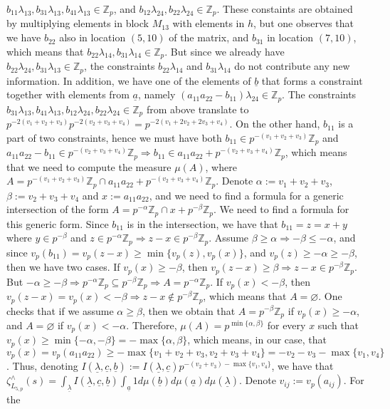 \documentclass{article}
\begin{document}
$b_{11}\lambda_{13},b_{31}\lambda_{13},b_{41}\lambda_{13}\in\mathbb{Z}_{p}$, and $b_{12}\lambda_{24},b_{22}\lambda_{24}\in\mathbb{Z}_{p}$. These constaints are obtained by multiplying elements in block $M_{13}$ with elements in $h$, but one observes that we have $b_{22}$ also in location $(5,10)$ of the matrix, and $b_{31}$ in location $(7,10)$, which means that $b_{22}\lambda_{14},b_{31}\lambda_{14}\in\mathbb{Z}_{p}$. But since we already have $b_{22}\lambda_{24},b_{31}\lambda_{13}\in\mathbb{Z}_{p}$, the constraints $b_{22}\lambda_{14}$ and $b_{31}\lambda_{14}$ do not contribute any new information. In addition, we have one of the elements of $\underline{b}$ that forms a constraint together with elements from $\underline{a}$, namely $(a_{11}a_{22}-b_{11})\lambda_{24}\in\mathbb{Z}_{p}$. The constraints $b_{31}\lambda_{13},b_{41}\lambda_{13},b_{12}\lambda_{24},b_{22}\lambda_{24}\in\mathbb{Z}_{p}$ from above translate to $p^{-2(v_{1}+v_{2}+v_{3})}p^{-2(v_{2}+v_{3}+v_{4})}=p^{-2(v_{1}+2v_{2}+2v_{3}+v_{4})}$. On the other hand, $b_{11}$ is a part of two constraints, hence we must have both $b_{11}\in{p^{-(v_{1}+v_{2}+v_{3})}\mathbb{Z}_{p}}$ and $a_{11}a_{22}-b_{11}\in{p^{-(v_{2}+v_{3}+v_{4})}\mathbb{Z}_{p}}\Rightarrow{b_{11}\in{a_{11}a_{22}+p^{-(v_{2}+v_{3}+v_{4})}\mathbb{Z}_{p}}}$, which means that we need to compute the measure $\mu(A)$, where $A=p^{-(v_{1}+v_{2}+v_{3})}\mathbb{Z}_{p}\cap{a_{11}a_{22}+p^{-(v_{2}+v_{3}+v_{4})}\mathbb{Z}_{p}}$. Denote $\alpha:=v_{1}+v_{2}+v_{3}$, $\beta:=v_{2}+v_{3}+v_{4}$ and $x:=a_{11}a_{22}$, and we need to find a formula for a generic intersection of the form $A={p^{-\alpha}\mathbb{Z}_{p}\cap{x+p^{-\beta}}\mathbb{Z}_{p}}$. We need to find a formula for this generic form. Since $b_{11}$ is in the intersection, we have that $b_{11}=z=x+y$ where $y\in{p^{-\beta}}$ and $z\in{p^{-\alpha}\mathbb{Z}_{p}}\Rightarrow{z-x\in{p^{-\beta}\mathbb{Z}_{p}}}$. Assume $\beta\geq\alpha\Rightarrow{-\beta\leq-\alpha}$, and since $v_{p}(b_{11})=v_{p}(z-x)\geq{\min\{v_{p}(z),v_{p}(x)\}}$, and $v_{p}(z)\geq{-\alpha}\geq{-\beta}$, then we have two cases. If $v_{p}(x)\geq{-\beta}$, then $v_{p}(z-x)\geq{\beta}\Rightarrow{z-x\in{p^{-\beta}\mathbb{Z}_{p}}}$. But $-\alpha\geq{-\beta}\Rightarrow{p^{-\alpha}\mathbb{Z}_{p}\subseteq{p^{-\beta}\mathbb{Z}_{p}}}\Rightarrow{A=p^{-\alpha}\mathbb{Z}_{p}}$. If $v_{p}(x)<{-\beta}$, then $v_{p}(z-x)=v_{p}(x)<-\beta\Rightarrow{z-x}\notin{p^{-\beta}\mathbb{Z}_{p}}$, which means that $A=\varnothing$. One checks that if we assume $\alpha\geq\beta$, then we obtain that $A=p^{-\beta}\mathbb{Z}_{p}$ if $v_{p}(x)\geq{-\alpha}$, and $A=\varnothing$ if $v_{p}(x)<-\alpha$. Therefore, $\mu(A)=p^{\min\{\alpha,\beta\}}$ for every $x$ such that $v_{p}(x)\geq\min\{-\alpha,-\beta\}=-\max\{\alpha,\beta\}$, which means, in our case, that $v_{p}(x)=v_{p}(a_{11}a_{22})\geq-\max\{v_{1}+v_{2}+v_{3},v_{2}+v_{3}+v_{4}\}=-v_{2}-v_{3}-\max\{v_{1},v_{4}\}$. Thus, denoting $I(\underline{\lambda},\underline{c},\underline{b}):=I(\underline{\lambda},\underline{c})p^{-(v_{2}+v_{3})-\max\{v_{1},v_{4}\}}$, we have that $\zeta_{L_{5,p}}^{\wedge}(s)=\displaystyle\int_{\underline\lambda}I(\underline{\lambda},\underline{c},\underline{b})\int_{\underline{a}}1d\mu(\underline{b})d\mu(\underline{a})d\mu(\underline{\lambda})$. Denote $v_{ij}:=v_{p}(a_{ij})$. For the 
\end{document}
